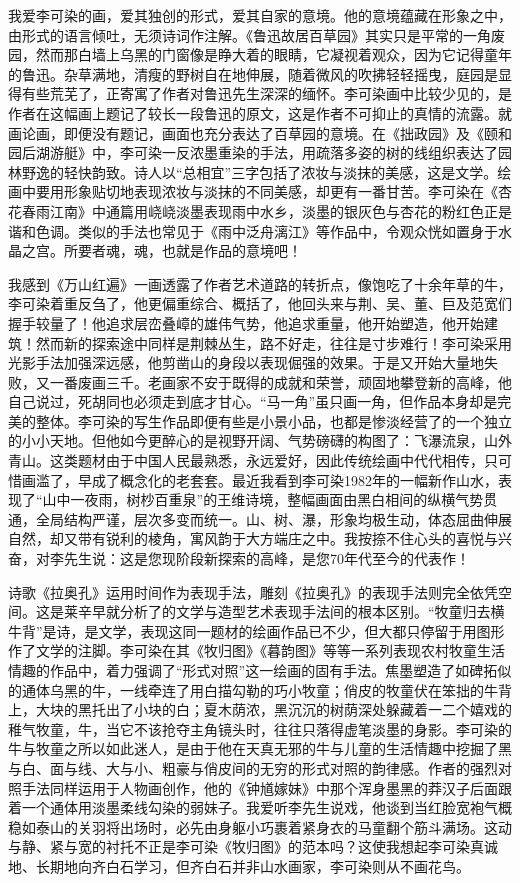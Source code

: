 \documentclass{article}
\begin{document}
我爱李可染的画，爱其独创的形式，爱其自家的意境。他的意境蕴藏在形象之中，由形式的语言倾吐，无须诗词作注解。《鲁迅故居百草园》其实只是平常的一角废园，然而那白墙上乌黑的门窗像是睁大着的眼睛，它凝视着观众，因为它记得童年的鲁迅。杂草满地，清瘦的野树自在地伸展，随着微风的吹拂轻轻摇曳，庭园是显得有些荒芜了，正寄寓了作者对鲁迅先生深深的缅怀。李可染画中比较少见的，是作者在这幅画上题记了较长一段鲁迅的原文，这是作者不可抑止的真情的流露。就画论画，即便没有题记，画面也充分表达了百草园的意境。在《拙政园》及《颐和园后湖游艇》中，李可染一反浓墨重染的手法，用疏落多姿的树的线组织表达了园林野逸的轻快韵致。诗人以“总相宜”三字包括了浓妆与淡抹的美感，这是文学。绘画中要用形象贴切地表现浓妆与淡抹的不同美感，却更有一番甘苦。李可染在《杏花春雨江南》中通篇用峣峣淡墨表现雨中水乡，淡墨的银灰色与杏花的粉红色正是谐和色调。类似的手法也常见于《雨中泛舟漓江》等作品中，令观众恍如置身于水晶之宫。所要者魂，魂，也就是作品的意境吧！

我感到《万山红遍》一画透露了作者艺术道路的转折点，像饱吃了十余年草的牛，李可染着重反刍了，他更偏重综合、概括了，他回头来与荆、吴、董、巨及范宽们握手较量了！他追求层峦叠嶂的雄伟气势，他追求重量，他开始塑造，他开始建筑！然而新的探索途中同样是荆棘丛生，路不好走，往往是寸步难行！李可染采用光影手法加强深远感，他剪凿山的身段以表现倔强的效果。于是又开始大量地失败，又一番废画三千。老画家不安于既得的成就和荣誉，顽固地攀登新的高峰，他自己说过，死胡同也必须走到底才甘心。“马一角”虽只画一角，但作品本身却是完美的整体。李可染的写生作品即便有些是小景小品，也都是惨淡经营了的一个独立的小小天地。但他如今更醉心的是视野开阔、气势磅礴的构图了：飞瀑流泉，山外青山。这类题材由于中国人民最熟悉，永远爱好，因此传统绘画中代代相传，只可惜画滥了，早成了概念化的老套套。最近我看到李可染1982年的一幅新作山水，表现了“山中一夜雨，树杪百重泉”的王维诗境，整幅画面由黑白相间的纵横气势贯通，全局结构严谨，层次多变而统一。山、树、瀑，形象均极生动，体态屈曲伸展自然，却又带有锐利的棱角，寓风韵于大方端庄之中。我按捺不住心头的喜悦与兴奋，对李先生说：这是您现阶段新探索的高峰，是您70年代至今的代表作！

诗歌《拉奥孔》运用时间作为表现手法，雕刻《拉奥孔》的表现手法则完全依凭空间。这是莱辛早就分析了的文学与造型艺术表现手法间的根本区别。“牧童归去横牛背”是诗，是文学，表现这同一题材的绘画作品已不少，但大都只停留于用图形作了文学的注脚。李可染在其《牧归图》《暮韵图》等等一系列表现农村牧童生活情趣的作品中，着力强调了“形式对照”这一绘画的固有手法。焦墨塑造了如碑拓似的通体乌黑的牛，一线牵连了用白描勾勒的巧小牧童；俏皮的牧童伏在笨拙的牛背上，大块的黑托出了小块的白；夏木荫浓，黑沉沉的树荫深处躲藏着一二个嬉戏的稚气牧童，牛，当它不该抢夺主角镜头时，往往只落得虚笔淡墨的身影。李可染的牛与牧童之所以如此迷人，是由于他在天真无邪的牛与儿童的生活情趣中挖掘了黑与白、面与线、大与小、粗豪与俏皮间的无穷的形式对照的韵律感。作者的强烈对照手法同样运用于人物画创作，他的《钟馗嫁妹》中那个浑身墨黑的莽汉子后面跟着一个通体用淡墨柔线勾染的弱妹子。我爱听李先生说戏，他谈到当红脸宽袍气概稳如泰山的关羽将出场时，必先由身躯小巧裹着紧身衣的马童翻个筋斗满场。这动与静、紧与宽的衬托不正是李可染《牧归图》的范本吗？这使我想起李可染真诚地、长期地向齐白石学习，但齐白石并非山水画家，李可染则从不画花鸟。
\end{document}
